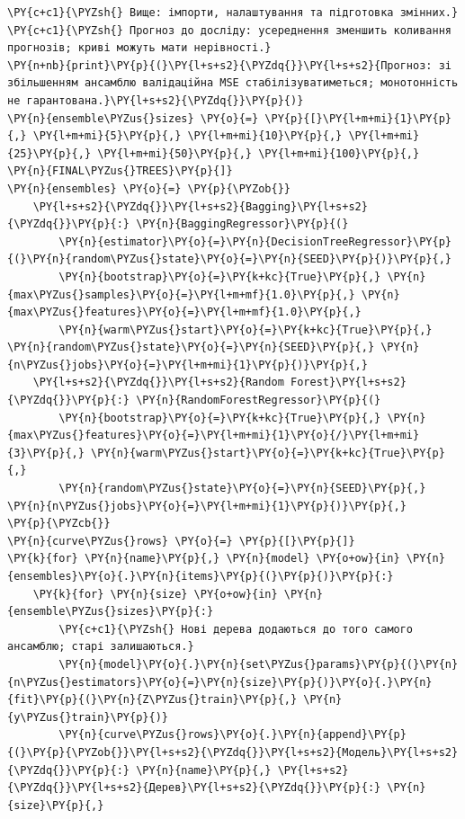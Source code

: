 \begin{Verbatim}[commandchars=\\\{\}]
\PY{c+c1}{\PYZsh{} Вище: імпорти, налаштування та підготовка змінних.}
\PY{c+c1}{\PYZsh{} Прогноз до досліду: усереднення зменшить коливання прогнозів; криві можуть мати нерівності.}
\PY{n+nb}{print}\PY{p}{(}\PY{l+s+s2}{\PYZdq{}}\PY{l+s+s2}{Прогноз: зі збільшенням ансамблю валідаційна MSE стабілізуватиметься; монотонність не гарантована.}\PY{l+s+s2}{\PYZdq{}}\PY{p}{)}
\PY{n}{ensemble\PYZus{}sizes} \PY{o}{=} \PY{p}{[}\PY{l+m+mi}{1}\PY{p}{,} \PY{l+m+mi}{5}\PY{p}{,} \PY{l+m+mi}{10}\PY{p}{,} \PY{l+m+mi}{25}\PY{p}{,} \PY{l+m+mi}{50}\PY{p}{,} \PY{l+m+mi}{100}\PY{p}{,} \PY{n}{FINAL\PYZus{}TREES}\PY{p}{]}
\PY{n}{ensembles} \PY{o}{=} \PY{p}{\PYZob{}}
    \PY{l+s+s2}{\PYZdq{}}\PY{l+s+s2}{Bagging}\PY{l+s+s2}{\PYZdq{}}\PY{p}{:} \PY{n}{BaggingRegressor}\PY{p}{(}
        \PY{n}{estimator}\PY{o}{=}\PY{n}{DecisionTreeRegressor}\PY{p}{(}\PY{n}{random\PYZus{}state}\PY{o}{=}\PY{n}{SEED}\PY{p}{)}\PY{p}{,}
        \PY{n}{bootstrap}\PY{o}{=}\PY{k+kc}{True}\PY{p}{,} \PY{n}{max\PYZus{}samples}\PY{o}{=}\PY{l+m+mf}{1.0}\PY{p}{,} \PY{n}{max\PYZus{}features}\PY{o}{=}\PY{l+m+mf}{1.0}\PY{p}{,}
        \PY{n}{warm\PYZus{}start}\PY{o}{=}\PY{k+kc}{True}\PY{p}{,} \PY{n}{random\PYZus{}state}\PY{o}{=}\PY{n}{SEED}\PY{p}{,} \PY{n}{n\PYZus{}jobs}\PY{o}{=}\PY{l+m+mi}{1}\PY{p}{)}\PY{p}{,}
    \PY{l+s+s2}{\PYZdq{}}\PY{l+s+s2}{Random Forest}\PY{l+s+s2}{\PYZdq{}}\PY{p}{:} \PY{n}{RandomForestRegressor}\PY{p}{(}
        \PY{n}{bootstrap}\PY{o}{=}\PY{k+kc}{True}\PY{p}{,} \PY{n}{max\PYZus{}features}\PY{o}{=}\PY{l+m+mi}{1}\PY{o}{/}\PY{l+m+mi}{3}\PY{p}{,} \PY{n}{warm\PYZus{}start}\PY{o}{=}\PY{k+kc}{True}\PY{p}{,}
        \PY{n}{random\PYZus{}state}\PY{o}{=}\PY{n}{SEED}\PY{p}{,} \PY{n}{n\PYZus{}jobs}\PY{o}{=}\PY{l+m+mi}{1}\PY{p}{)}\PY{p}{,}
\PY{p}{\PYZcb{}}
\PY{n}{curve\PYZus{}rows} \PY{o}{=} \PY{p}{[}\PY{p}{]}
\PY{k}{for} \PY{n}{name}\PY{p}{,} \PY{n}{model} \PY{o+ow}{in} \PY{n}{ensembles}\PY{o}{.}\PY{n}{items}\PY{p}{(}\PY{p}{)}\PY{p}{:}
    \PY{k}{for} \PY{n}{size} \PY{o+ow}{in} \PY{n}{ensemble\PYZus{}sizes}\PY{p}{:}
        \PY{c+c1}{\PYZsh{} Нові дерева додаються до того самого ансамблю; старі залишаються.}
        \PY{n}{model}\PY{o}{.}\PY{n}{set\PYZus{}params}\PY{p}{(}\PY{n}{n\PYZus{}estimators}\PY{o}{=}\PY{n}{size}\PY{p}{)}\PY{o}{.}\PY{n}{fit}\PY{p}{(}\PY{n}{Z\PYZus{}train}\PY{p}{,} \PY{n}{y\PYZus{}train}\PY{p}{)}
        \PY{n}{curve\PYZus{}rows}\PY{o}{.}\PY{n}{append}\PY{p}{(}\PY{p}{\PYZob{}}\PY{l+s+s2}{\PYZdq{}}\PY{l+s+s2}{Модель}\PY{l+s+s2}{\PYZdq{}}\PY{p}{:} \PY{n}{name}\PY{p}{,} \PY{l+s+s2}{\PYZdq{}}\PY{l+s+s2}{Дерев}\PY{l+s+s2}{\PYZdq{}}\PY{p}{:} \PY{n}{size}\PY{p}{,}

\end{Verbatim}
